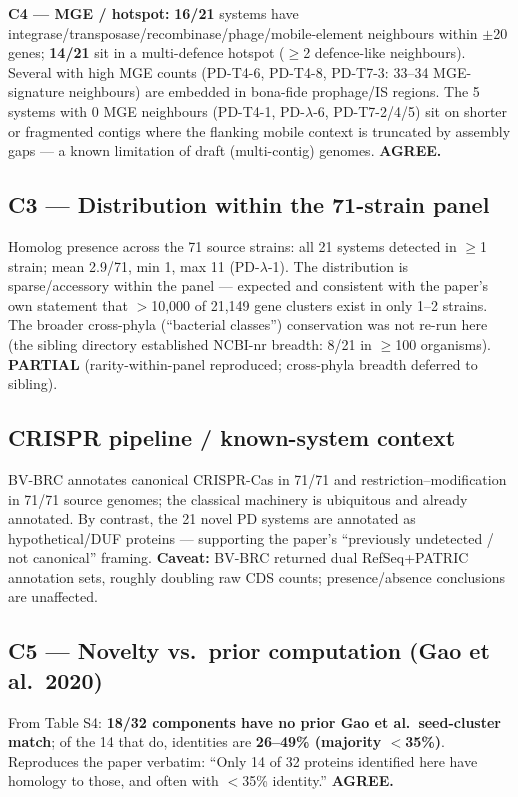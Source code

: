 \documentclass[11pt,letterpaper]{article}
\begin{document}
\textbf{C4 --- MGE / hotspot:} \textbf{16/21} systems have integrase/transposase/recombinase/phage/mobile-element neighbours within $\pm$20 genes; \textbf{14/21} sit in a multi-defence hotspot ($\ge$2 defence-like neighbours). Several with high MGE counts (PD-T4-6, PD-T4-8, PD-T7-3: 33--34 MGE-signature neighbours) are embedded in bona-fide prophage/IS regions. The 5 systems with 0 MGE neighbours (PD-T4-1, PD-$\lambda$-6, PD-T7-2/4/5) sit on shorter or fragmented contigs where the flanking mobile context is truncated by assembly gaps --- a known limitation of draft (multi-contig) genomes. \textbf{AGREE.}

\subsection{C3 --- Distribution within the 71-strain panel}
Homolog presence across the 71 source strains: all 21 systems detected in $\ge$1 strain; mean 2.9/71, min 1, max 11 (PD-$\lambda$-1). The distribution is sparse/accessory within the panel --- expected and consistent with the paper's own statement that $>$10{,}000 of 21{,}149 gene clusters exist in only 1--2 strains. The broader cross-phyla (``bacterial classes'') conservation was not re-run here (the sibling directory established NCBI-nr breadth: 8/21 in $\ge$100 organisms). \textbf{PARTIAL} (rarity-within-panel reproduced; cross-phyla breadth deferred to sibling).

\subsection{CRISPR pipeline / known-system context}
BV-BRC annotates canonical CRISPR-Cas in 71/71 and restriction--modification in 71/71 source genomes; the classical machinery is ubiquitous and already annotated. By contrast, the 21 novel PD systems are annotated as hypothetical/DUF proteins --- supporting the paper's ``previously undetected / not canonical'' framing. \textbf{Caveat:} BV-BRC returned dual RefSeq+PATRIC annotation sets, roughly doubling raw CDS counts; presence/absence conclusions are unaffected.

\subsection{C5 --- Novelty vs.\ prior computation (Gao et al.\ 2020)}
From Table S4: \textbf{18/32 components have no prior Gao et al.\ seed-cluster match}; of the 14 that do, identities are \textbf{26--49\% (majority $<$35\%)}. Reproduces the paper verbatim: ``Only 14 of 32 proteins identified here have homology to those, and often with $<$35\% identity.'' \textbf{AGREE.}
\end{document}
